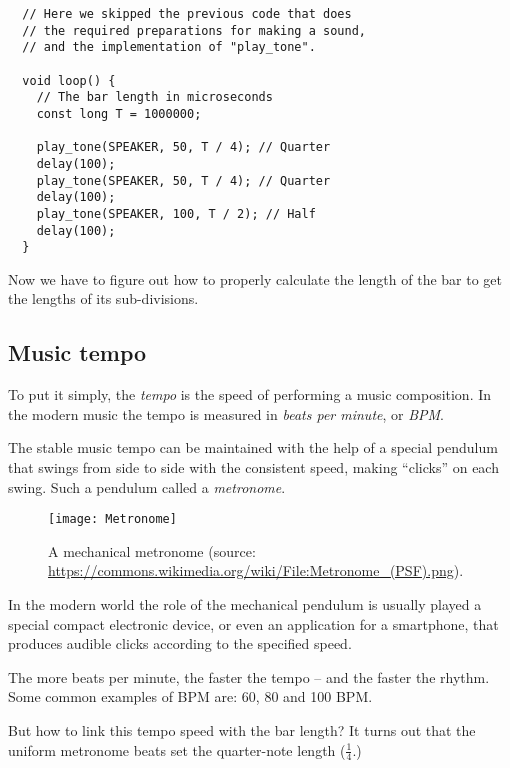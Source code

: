 \documentclass[../sparc.tex]{subfiles}
\begin{document}
\begin{verbatim}
  // Here we skipped the previous code that does
  // the required preparations for making a sound,
  // and the implementation of "play_tone".

  void loop() {
    // The bar length in microseconds
    const long T = 1000000;

    play_tone(SPEAKER, 50, T / 4); // Quarter
    delay(100);
    play_tone(SPEAKER, 50, T / 4); // Quarter
    delay(100);
    play_tone(SPEAKER, 100, T / 2); // Half
    delay(100);
  }
\end{verbatim}

Now we have to figure out how to properly calculate the length of the bar to get
the lengths of its sub-divisions.

\subsection{Music tempo}

To put it simply, the \emph{tempo} is the speed of performing a music
composition.  In the modern music the tempo is measured in \emph{beats per
minute}, or \emph{BPM}.

The stable music tempo can be maintained with the help of a special pendulum
that swings from side to side with the consistent speed, making ``clicks'' on
each swing.  Such a pendulum called a \emph{metronome}.

\begin{figure}[h]
  \centering
  \texttt{[image: Metronome]}
  \caption{A mechanical metronome (source:
    \url{https://commons.wikimedia.org/wiki/File:Metronome_(PSF).png}).}
  \label{fig:sound-metronome}
\end{figure}

In the modern world the role of the mechanical pendulum is usually played a
special compact electronic device, or even an application for a smartphone, that
produces audible clicks according to the specified speed.

The more beats per minute, the faster the tempo -- and the faster the rhythm.
Some common examples of \gls{BPM} are: 60, 80 and 100 BPM.

But how to link this tempo speed with the bar length?  It turns out that the
uniform metronome beats set the quarter-note length ($\frac{1}{4}$.)
\end{document}

